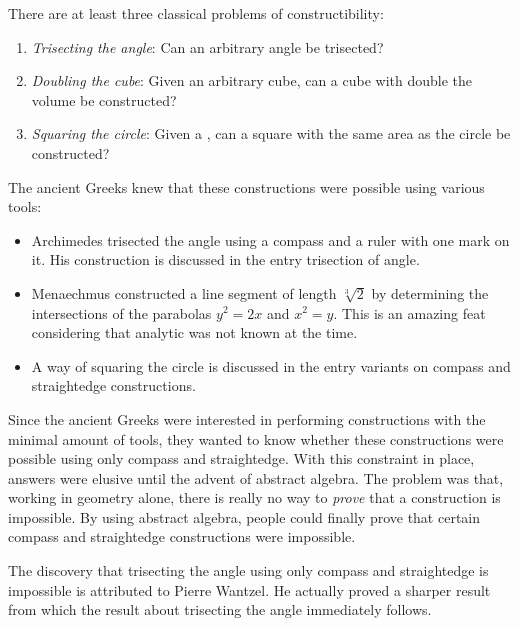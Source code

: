 \documentclass[12pt]{article}
\begin{document}

There are at least three classical problems of constructibility:

\begin{enumerate}
\item \emph{Trisecting the angle}: Can an arbitrary angle be trisected?
\item \emph{Doubling the cube}: Given an arbitrary cube, can a cube with double the volume be constructed?
\item \emph{Squaring the circle}: Given a , can a square with the same area as the circle be constructed?
\end{enumerate}

The ancient Greeks knew that these constructions were possible using various tools:

\begin{itemize}
\item Archimedes trisected the angle using a compass and a ruler with one mark on it.  His construction is discussed in the entry trisection of angle.
\item Menaechmus constructed a line segment of length $\sqrt[3]{2}$ by determining the intersections of the parabolas $y^2=2x$ and $x^2=y$.  This is an amazing feat considering that analytic  was not known at the time.
\item A way of squaring the circle is discussed in the entry variants on compass and straightedge constructions.
\end{itemize}

Since the ancient Greeks were interested in performing constructions with the minimal amount of tools, they wanted to know whether these constructions were possible using only compass and straightedge.  With this constraint in place, answers were elusive until the advent of abstract algebra.  The problem was that, working in geometry alone, there is really no way to \emph{prove} that a construction is impossible.  By using abstract algebra, people could finally prove that certain compass and straightedge constructions were impossible.

The discovery that trisecting the angle using only compass and straightedge is impossible is attributed to Pierre Wantzel.  He actually proved a sharper result from which the result about trisecting the angle immediately follows.
\end{document}
